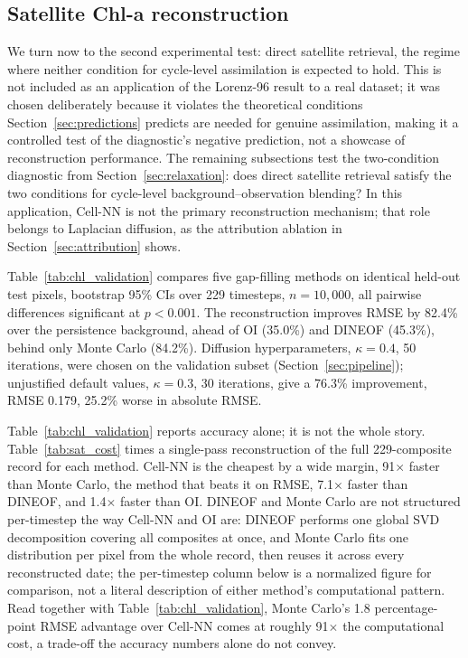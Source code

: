 \documentclass[final,5p,times,twocolumn,authoryear]{elsarticle}
\begin{document}
\subsection{Satellite Chl-a reconstruction}
\label{sec:chlresults}

We turn now to the second experimental test: direct satellite
retrieval, the regime where neither condition for cycle-level
assimilation is expected to hold. This is not included as an
application of the Lorenz-96 result to a real dataset; it was chosen
deliberately because it violates the theoretical conditions
Section~\ref{sec:predictions} predicts are needed for genuine
assimilation, making it a controlled test of the diagnostic's
negative prediction, not a showcase of reconstruction performance.
The remaining subsections test the two-condition diagnostic from
Section~\ref{sec:relaxation}: does direct satellite retrieval satisfy
the two conditions for cycle-level background--observation blending?
In this application, Cell-NN is not the primary reconstruction
mechanism; that role belongs to Laplacian diffusion, as the
attribution ablation in Section~\ref{sec:attribution} shows.

Table~\ref{tab:chl_validation} compares five gap-filling methods on
identical held-out test pixels, bootstrap 95\% CIs over 229
timesteps, $n=10{,}000$, all pairwise differences significant at
$p<0.001$. The reconstruction improves RMSE by 82.4\% over the
persistence background, ahead of OI (35.0\%) and DINEOF (45.3\%),
behind only Monte Carlo (84.2\%). Diffusion hyperparameters,
$\kappa=0.4$, 50 iterations, were chosen on the validation subset
(Section~\ref{sec:pipeline}); unjustified default values, $\kappa=0.3$,
30 iterations, give a 76.3\% improvement, RMSE 0.179, 25.2\% worse in
absolute RMSE.

Table~\ref{tab:chl_validation} reports accuracy alone; it is not the
whole story. Table~\ref{tab:sat_cost} times a single-pass
reconstruction of the full 229-composite record for each method.
Cell-NN is the cheapest by a wide margin, 91$\times$ faster than
Monte Carlo, the method that beats it on RMSE, 7.1$\times$ faster
than DINEOF, and 1.4$\times$ faster than OI. DINEOF and Monte Carlo
are not structured per-timestep the way Cell-NN and OI are: DINEOF
performs one global SVD decomposition covering all composites at
once, and Monte Carlo fits one distribution per pixel from the whole
record, then reuses it across every reconstructed date; the
per-timestep column below is a normalized figure for comparison, not
a literal description of either method's computational pattern. Read
together with Table~\ref{tab:chl_validation}, Monte Carlo's 1.8
percentage-point RMSE advantage over Cell-NN comes at roughly
91$\times$ the computational cost, a trade-off the accuracy numbers
alone do not convey.
\end{document}
